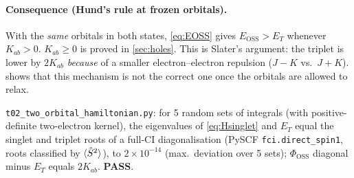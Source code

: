 \paragraph{Consequence (Hund's rule at frozen orbitals).} With the \emph{same} orbitals in both states,
\cref{eq:EOSS} gives $E_{\text{OSS}}>E_T$ whenever $K_{ab}>0$. $K_{ab}\ge0$ is proved in
\cref{sec:holes}. This is Slater's argument: the triplet is lower by $2K_{ab}$ \emph{because} of a smaller
electron--electron repulsion ($J-K$ vs.\ $J+K$).  shows that this mechanism is
not the correct one once the orbitals are allowed to relax.

\begin{verifybox}
\texttt{t02\_two\_orbital\_hamiltonian.py}: for 5 random sets of integrals (with positive-definite
two-electron kernel), the eigenvalues of \cref{eq:Hsinglet} and $E_T$ equal the singlet and triplet roots
of a full-CI diagonalisation (PySCF \texttt{fci.direct\_spin1}, roots classified by $\langle \hat S^2\rangle$),
to $2\times10^{-14}$ (max.\ deviation over 5 sets); $\Phi_{\text{OSS}}$ diagonal minus $E_T$ equals $2K_{ab}$. \textbf{PASS}.
\end{verifybox}
